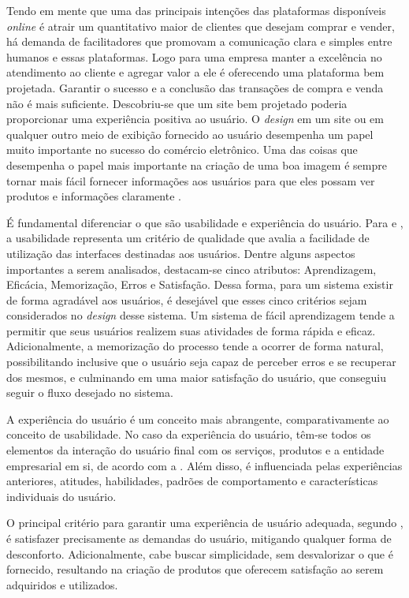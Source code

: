 Tendo em mente que uma das principais intenções das plataformas disponíveis \textit{online} é atrair um quantitativo maior de clientes que desejam comprar e vender, há demanda de facilitadores que promovam a comunicação clara e simples entre humanos e essas plataformas. Logo para uma empresa manter a excelência no atendimento ao cliente e agregar valor a ele é oferecendo uma plataforma bem projetada. Garantir o sucesso e a conclusão das transações de compra e venda não é mais suficiente. Descobriu-se que um site bem projetado poderia proporcionar uma experiência positiva ao usuário. O \textit{design} em um site ou em qualquer outro meio de exibição fornecido ao usuário desempenha um papel muito importante no sucesso do comércio eletrônico. Uma das coisas que desempenha o papel mais importante na criação de uma boa imagem é sempre tornar mais fácil fornecer informações aos usuários para que eles possam ver produtos e informações claramente \cite{SudianaChandra}.

É fundamental diferenciar o que são usabilidade e experiência do usuário. Para  e , a usabilidade representa um critério de qualidade que avalia a facilidade de utilização das interfaces destinadas aos usuários. Dentre alguns aspectos importantes a serem analisados, destacam-se cinco atributos: Aprendizagem, Eficácia, Memorização, Erros e Satisfação. Dessa forma, para um sistema existir de forma agradável aos usuários, é desejável que esses cinco critérios sejam considerados no \textit{design} desse sistema. Um sistema de fácil aprendizagem tende a permitir que seus usuários realizem suas atividades de forma rápida e eficaz. Adicionalmente, a memorização do processo tende a ocorrer de forma natural, possibilitando inclusive que o usuário seja capaz de perceber erros e se recuperar dos mesmos, e culminando em uma maior satisfação do usuário, que conseguiu seguir o fluxo desejado no sistema.

A experiência do usuário é um conceito mais abrangente, comparativamente ao conceito de usabilidade. No caso da experiência do usuário, têm-se todos os elementos da interação do usuário final com os serviços, produtos e a entidade empresarial em si, de acordo com a . Além disso, é influenciada pelas experiências anteriores, atitudes, habilidades, padrões de comportamento e características individuais do usuário.

O principal critério para garantir uma experiência de usuário adequada, segundo , é satisfazer precisamente as demandas do usuário, mitigando qualquer forma de desconforto. Adicionalmente, cabe buscar simplicidade, sem desvalorizar o que é fornecido, resultando na criação de produtos que oferecem satisfação ao serem adquiridos e utilizados.

